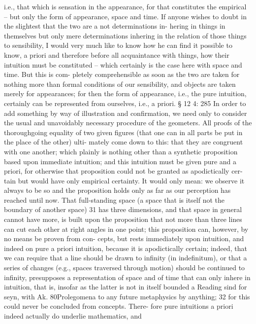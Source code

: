 i.e., that which is sensation in the appearance, for that constitutes the
empirical – but only the form of appearance, space and time. If anyone
wishes to doubt in the slightest that the two are a not determinations in-
hering in things in themselves but only mere determinations inhering
in the relation of those things to sensibility, I would very much like to
know how he can ﬁnd it possible to know, a priori and therefore before
all acquaintance with things, how their intuition must be constituted –
which certainly is the case here with space and time. But this is com-
pletely comprehensible as soon as the two are taken for nothing more
than formal conditions of our sensibility, and objects are taken merely
for appearances; for then the form of appearance, i.e., the pure intuition,
certainly can be represented from ourselves, i.e., a priori.
§ 12
4: 285
In order to add something by way of illustration and conﬁrmation, we
need only to consider the usual and unavoidably necessary procedure of
the geometers. All proofs of the thoroughgoing equality of two given
ﬁgures (that one can in all parts be put in the place of the other) ulti-
mately come down to this: that they are congruent with one another;
which plainly is nothing other than a synthetic proposition based upon
immediate intuition; and this intuition must be given pure and a priori,
for otherwise that proposition could not be granted as apodictically cer-
tain but would have only empirical certainty. It would only mean: we
observe it always to be so and the proposition holds only as far as our
perception has reached until now. That full-standing space (a space that
is itself not the boundary of another space) 31 has three dimensions, and
that space in general cannot have more, is built upon the proposition
that not more than three lines can cut each other at right angles in one
point; this proposition can, however, by no means be proven from con-
cepts, but rests immediately upon intuition, and indeed on pure a priori
intuition, because it is apodictically certain; indeed, that we can require
that a line should be drawn to inﬁnity (in indeﬁnitum), or that a series of
changes (e.g., spaces traversed through motion) should be continued to
inﬁnity, presupposes a representation of space and of time that can only
inhere in intuition, that is, insofar as the latter is not in itself bounded
a
Reading sind for seyn, with Ak.
80Prolegomena to any future metaphysics
by anything; 32 for this could never be concluded from concepts. There-
fore pure intuitions a priori indeed actually do underlie mathematics, and
